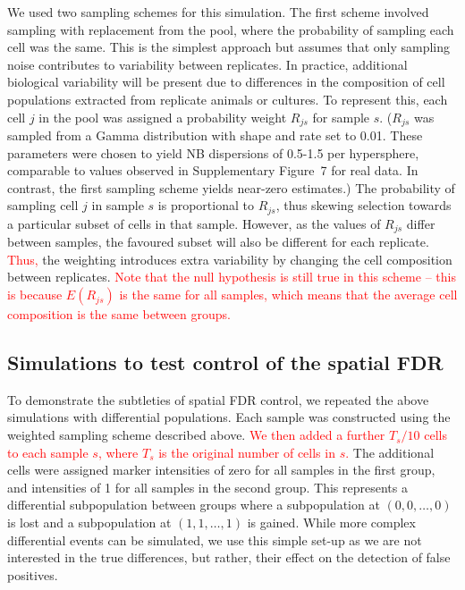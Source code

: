 \documentclass{article}
\newcommand\revised[1]{\textcolor{red}{#1}}
\newcommand{\suppfignbdisp}{7}
\begin{document}
We used two sampling schemes for this simulation.
The first scheme involved sampling with replacement from the pool, where the probability of sampling each cell was the same.
This is the simplest approach but assumes that only sampling noise contributes to variability between replicates.
In practice, additional biological variability will be present due to differences in the composition of cell populations extracted from replicate animals or cultures.
To represent this, each cell $j$ in the pool was assigned a probability weight $R_{js}$ for sample $s$.
($R_{js}$ was sampled from a Gamma distribution with shape and rate set to 0.01.
These parameters were chosen to yield NB dispersions of 0.5-1.5 per hypersphere, comparable to values observed in Supplementary Figure~\suppfignbdisp{} for real data.
In contrast, the first sampling scheme yields near-zero estimates.)
The probability of sampling cell $j$ in sample $s$ is proportional to $R_{js}$, thus skewing selection towards a particular subset of cells in that sample.
However, as the values of $R_{js}$ differ between samples, the favoured subset will also be different for each replicate.
\revised{Thus,} the weighting introduces extra variability by changing the cell composition between replicates.
\revised{Note that the null hypothesis is still true in this scheme -- this is because $E(R_{js})$ is the same for all samples, which means that the average cell composition is the same between groups.} 

\subsection{Simulations to test control of the spatial FDR}
To demonstrate the subtleties of spatial FDR control, we repeated the above simulations with differential populations.
Each sample was constructed using the weighted sampling scheme described above.
\revised{We then added a further $T_s/10$ cells to each sample $s$, where $T_s$ is the original number of cells in $s$.}
The additional cells were assigned marker intensities of zero for all samples in the first group, and intensities of 1 for all samples in the second group.
This represents a differential subpopulation between groups where a subpopulation at $(0,0, \ldots, 0)$ is lost and a subpopulation at $(1, 1, \ldots, 1)$ is gained.
While more complex differential events can be simulated, we use this simple set-up as we are not interested in the true differences, but rather, their effect on the detection of false positives.
\end{document}
